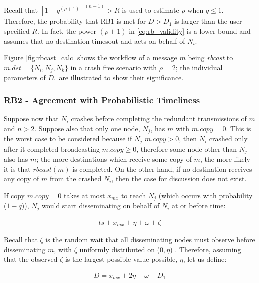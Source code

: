         Recall that $\left[1 - q ^ {(\rho + 1)} \right] ^{(n - 1)} > R$ is used to estimate $\rho$ when $q \leq 1$.  Therefore, the probability that RB1 is met for $D > D_1$ is larger than the user specified $R$.  In fact, the power $(\rho + 1)$ in \ref{eq:rb_validity} is a lower bound and assumes that no destination timesout and acts on behalf of $N_i$.  
        
        Figure \ref{fig:rbcast_calc} shows the workflow of a message $m$ being \emph{rbcast} to $m.dst = \{N_i, N_j, N_k\}$ in a crash free scenario with $\rho = 2$; the individual parameters of $D_1$ are illustrated to show their significance.  
                
        \clearpage
        \subsubsection*{RB2 - Agreement with Probabilistic Timeliness}
Suppose now that $N_i$ crashes before completing the redundant transmissions of $m$ and $n>2$.  Suppose also that only one node, $N_j$, has $m$ with $m.copy=0$. This is the worst case to be considered because if $N_j$ $m.copy>0$, then $N_i$ crashed only after it completed broadcasting $m.copy \geq 0$, therefore some node other than $N_j$ also has $m$; the more destinations which receive some copy of $m$, the more likely it is that $rbcast(m)$ is completed.  On the other hand, if no destination receives any copy of $m$ from the crashed $N_i$, then the case for discussion does not exist.  

If copy $m.copy = 0$ takes at most $x_{mx}$ to reach $N_j$ (which occurs with probability ($1-q$)), $N_j$ would start disseminating on behalf of $N_i$ at or before time:
        
        \begin{equation}
            \begin{aligned}
                ts+ x_{mx} + \eta + \omega +\zeta
            \end{aligned}
        \end{equation}
        
Recall that $\zeta$ is the random wait that all disseminating nodes must observe before disseminating $m$, with $\zeta$ uniformly distributed on ($0, \eta$) .  Therefore, assuming that the observed $\zeta$ is the largest possible value possible, $\eta$, let us define: 

        \begin{equation}
            \begin{aligned}
                D = x_{mx} + 2\eta + \omega + D_1
            \end{aligned}
        \end{equation}
        

